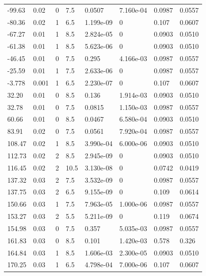 \documentclass[preview]{standalone}
\begin{document}
{{\begin{tabular}{L{1.2cm}C{1.2cm} C{0.3cm}C{0.5cm} C{1.4cm}C{1.4cm} C{1.4cm}C{1.4cm}}
  -99.63  &  0.02  & 0     & 7.5 &  0.0507  & 7.160e-04  & 0.0987 &  0.0557   \\ 
  -80.36  &  0.02  & 1     & 6.5 &  1.199e-09  & 0  & 0.107 &  0.0607   \\ 
  -67.27  &  0.01  & 1     & 8.5 &  2.824e-05  & 0  & 0.0903 &  0.0510   \\ 
  -61.38  &  0.01  & 1     & 8.5 &  5.623e-06  & 0  & 0.0903 &  0.0510   \\ 
  -46.45  &  0.01  & 0     & 7.5 &  0.295  & 4.166e-03  & 0.0987 &  0.0557   \\ 
  -25.59  &  0.01  & 1     & 7.5 &  2.633e-06  & 0  & 0.0987 &  0.0557   \\ 
  -3.778  &  0.001  & 1     & 6.5 &  2.230e-07  & 0  & 0.107 &  0.0607   \\ 
  32.20  &  0.01  & 0     & 8.5 &  0.136  & 1.914e-03  & 0.0903 &  0.0510   \\ 
  32.78  &  0.01  & 0     & 7.5 &  0.0815  & 1.150e-03  & 0.0987 &  0.0557   \\ 
  60.66  &  0.01  & 0     & 8.5 &  0.0467  & 6.580e-04  & 0.0903 &  0.0510   \\ 
  83.91  &  0.02  & 0     & 7.5 &  0.0561  & 7.920e-04  & 0.0987 &  0.0557   \\ 
  108.47  &  0.02  & 1     & 8.5 &  3.990e-04  & 6.000e-06  & 0.0903 &  0.0510   \\ 
  112.73  &  0.02  & 2     & 8.5 &  2.945e-09  & 0  & 0.0903 &  0.0510   \\ 
  116.45  &  0.02  & 2     & 10.5 &  3.130e-08  & 0  & 0.0742 &  0.0419   \\ 
  137.32  &  0.03  & 2     & 7.5 &  3.532e-09  & 0  & 0.0987 &  0.0557   \\ 
  137.75  &  0.03  & 2     & 6.5 &  9.155e-09  & 0  & 0.109 &  0.0614   \\ 
  150.66  &  0.03  & 1     & 7.5 &  7.963e-05  & 1.000e-06  & 0.0987 &  0.0557   \\ 
  153.27  &  0.03  & 2     & 5.5 &  5.211e-09  & 0  & 0.119 &  0.0674   \\ 
  154.98  &  0.03  & 0     & 7.5 &  0.357  & 5.035e-03  & 0.0987 &  0.0557   \\ 
  161.83  &  0.03  & 0     & 8.5 &  0.101  & 1.420e-03  & 0.578 &  0.326   \\ 
  164.84  &  0.03  & 1     & 8.5 &  1.606e-03  & 2.300e-05  & 0.0903 &  0.0510   \\ 
  170.25  &  0.03  & 1     & 6.5 &  4.798e-04  & 7.000e-06  & 0.107 &  0.0607   \\ 

\end{tabular}}}
\end{document}
